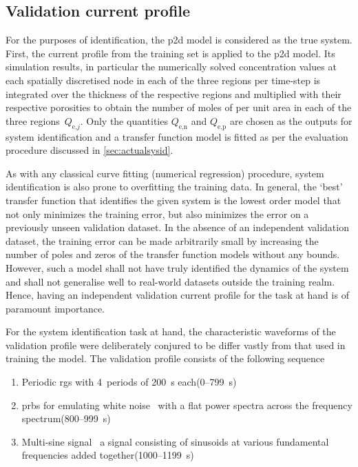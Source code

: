 \subsection{Validation current profile}

For the  purposes of identification,  the \gls{p2d}  model is considered  as the
true system. First, the current profile from  the training set is applied to the
\gls{p2d} model.  Its simulation results,  in particular the  numerically solved
concentration values  at each spatially  discretised node  in each of  the three
regions per time-step is integrated over the thickness of the respective regions
and multiplied with their respective porosities to obtain the number of moles of
 per unit area in each  of the three regions~$Q_{\text{e,}j}$. Only the
quantities  $Q_\text{e,n}$ and  $Q_\text{e,p}$  are chosen  as  the outputs  for
system  identification and  a  transfer  function model  is  fitted  as per  the
evaluation procedure discussed in \cref{sec:actualsysid}.

As with  any classical  curve fitting  (numerical regression)  procedure, system
identification is also  prone to overfitting the training data.  In general, the
`best' transfer  function that identifies the  given system is the  lowest order
model that not  only minimizes the training error, but  also minimizes the error
on a  previously unseen  validation dataset.  In the  absence of  an independent
validation  dataset,  the  training  error  can be  made  arbitrarily  small  by
increasing the number of poles and zeros of the transfer function models without
any bounds. However,  such a model shall not have  truly identified the dynamics
of the system  and shall not generalise well to  real-world datasets outside the
training realm. Hence, having an  independent validation current profile for the
task at hand is of paramount importance.

For the system identification task at  hand, the characteristic waveforms of the
validation profile were deliberately conjured to be differ vastly from that used
in training the model. The  validation profile consists of the following
sequence
\begin{enumerate}
    \item Periodic \gls{rgs} with 4~periods of \SI{200}{\second} each\quad (0--\SI{799}{\second})
    \item \gls{prbs} for emulating white noise \ie~with a flat power spectra
        across the frequency spectrum\quad (800--\SI{999}{\second})
    \item Multi-sine signal \ie~a signal consisting of sinusoids at
        various fundamental frequencies added together\quad (1000--\SI{1199}{\second})
\end{enumerate}

